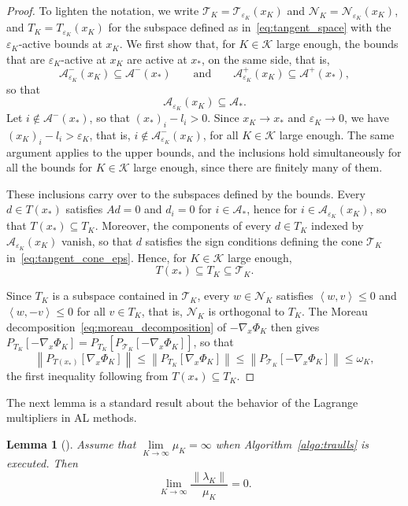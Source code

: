 \documentclass{article}
\numberwithin{equation}{section}
\newcommand{\calA}{{\mathcal{A}}}
\newcommand{\calK}{{\mathcal{K}}}
\newcommand{\calN}{{\mathcal{N}}}
\newcommand{\calT}{{\mathcal{T}}}
\newcommand{\inner}[2]{\left\langle {#1} , {#2} \right\rangle} %
\newcommand{\proj}[2]{P_{#1} \left[ {#2} \right]} %
\theoremstyle{plain}
\newtheorem{lemma}[theorem]{Lemma}
\begin{document}
\begin{proof}
	To lighten the notation, we write $\calT_K = \calT_{\varepsilon_K}(x_K)$ and $\calN_K = \calN_{\varepsilon_K}(x_K)$, and $T_K = T_{\varepsilon_K}(x_K)$ for the subspace defined as in~\eqref{eq:tangent_space} with the $\varepsilon_K$-active bounds at $x_K$. We first show that, for $K \in \calK$ large enough, the bounds that are $\varepsilon_K$-active at $x_K$ are active at $x_*$, on the same side, that is,
	\[\calA^-_{\varepsilon_K}(x_K) \subseteq \calA^-(x_*) \qquad \text{and} \qquad \calA^+_{\varepsilon_K}(x_K) \subseteq \calA^+(x_*),\]
	so that 
	\[\calA_{\varepsilon_K}(x_K) \subseteq \calA_*.\]
	Let $i \notin \calA^-(x_*)$, so that $(x_*)_i - l_i > 0$. Since $x_K \to x_*$ and $\varepsilon_K \to 0$, we have $(x_K)_i - l_i > \varepsilon_K$, that is, $i \notin \calA^-_{\varepsilon_K}(x_K)$, for all $K \in \calK$ large enough. The same argument applies to the upper bounds, and the inclusions hold simultaneously for all the bounds for $K \in \calK$ large enough, since there are finitely many of them.

	These inclusions carry over to the subspaces defined by the bounds. Every $d \in T(x_*)$ satisfies $Ad = 0$ and $d_i = 0$ for $i \in \calA_*$, hence for $i \in \calA_{\varepsilon_K}(x_K)$, so that $T(x_*) \subseteq T_K$. Moreover, the components of every $d \in T_K$ indexed by $\calA_{\varepsilon_K}(x_K)$ vanish, so that $d$ satisfies the sign conditions defining the cone $\calT_K$ in~\eqref{eq:tangent_cone_eps}. Hence, for $K \in \calK$ large enough,
	\[T(x_*) \subseteq T_K \subseteq \calT_K.\]

	Since $T_K$ is a subspace contained in $\calT_K$, every $w \in \calN_K$ satisfies $\inner{w}{v} \le 0$ and $\inner{w}{-v} \le 0$ for all $v \in T_K$, that is, $\calN_K$ is orthogonal to $T_K$. The Moreau decomposition~\eqref{eq:moreau_decomposition} of $-\nabla_x\Phi_K$ then gives $\proj{T_K}{-\nabla_x\Phi_K} = \proj{T_K}{\proj{\calT_K}{-\nabla_x\Phi_K}}$, so that
	\begin{equation*}
		\left\| \proj{T(x_*)}{\nabla_x \Phi_K} \right\| \le \left\| \proj{T_K}{\nabla_x \Phi_K} \right\| \le \left\| \proj{\calT_K}{-\nabla_x \Phi_K} \right\| \le \omega_K,
	\end{equation*}
	the first inequality following from $T(x_*) \subseteq T_K$.
\end{proof}

The next lemma is a standard result about the behavior of the Lagrange multipliers in AL methods.
\begin{lemma}[{\cite[Lemma~14.4.1]{conn-etal:2000}}]\label{lemma:behavior_multipliers}
	Assume that $\lim\limits_{K\to \infty} \mu_K = \infty$ when Algorithm~\ref{algo:traulls} is executed. Then 
	\begin{equation*}
		\lim\limits_{K\to \infty} \frac{\|\lambda_K\|}{\mu_K} = 0.
	\end{equation*}
\end{lemma}
\end{document}
